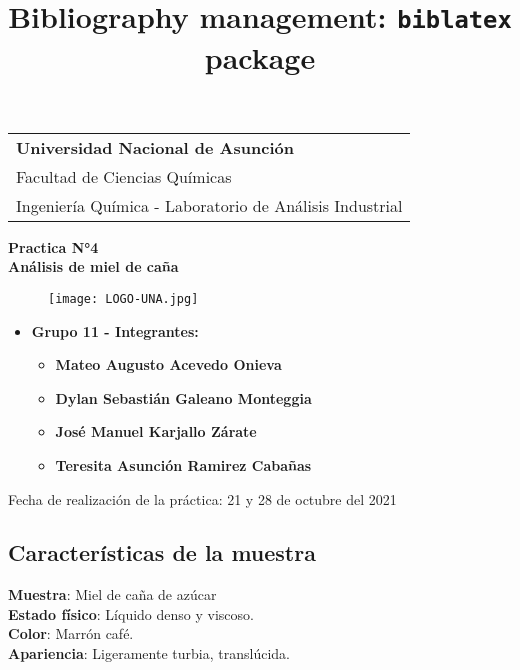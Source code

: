 \documentclass[a4paper,12pt]{article} %
\title{Bibliography management: \texttt{biblatex} package}
\begin{document}
\thispagestyle{empty} 
\begin{tabular}{p{15.5cm}}
{\large \bf Universidad Nacional de Asunción} \\
Facultad de Ciencias Químicas \\ 
Ingeniería Química - Laboratorio de Análisis Industrial \\
\hline
\end{tabular} 

\vspace*{0.3cm} %

\begin{center} 
    {\Large \bf Practica N°4  \\ \vspace{3mm} Análisis de miel de caña}
    \vspace{15mm}
    \begin{figure}[H] 
	    \centering
        \texttt{[image: LOGO-UNA.jpg]}
    \end{figure}
\end{center}

\vspace{15mm}

\begin{itemize}
    \item \textbf{Grupo 11 - Integrantes:}
    \begin{itemize}
        \item{\bf Mateo Augusto Acevedo Onieva}
        \item{\bf Dylan Sebastián Galeano Monteggia}
        \item{\bf José Manuel Karjallo Zárate}
        \item{\bf Teresita Asunción Ramirez Cabañas}
    \end{itemize}
\end{itemize}

Fecha de realización de la práctica: 21 y 28 de octubre del 2021


\newpage

\subsection{Características de la muestra} %
{\bf Muestra}: Miel de caña de azúcar  \\
{\bf Estado físico}: Líquido denso y viscoso. \\
{\bf Color}: Marrón café. \\
{\bf Apariencia}: Ligeramente turbia, translúcida. 
\end{document}
